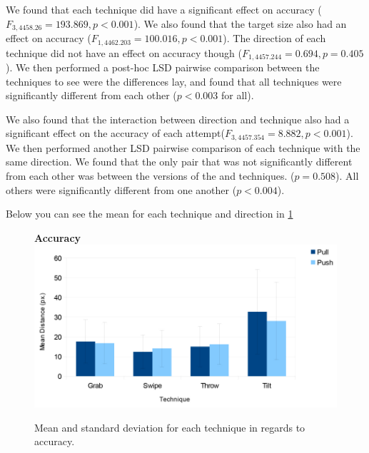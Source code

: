 We found that each technique did have a significant effect on accuracy ($F_{3,4458.26}=193.869, p<0.001$).
We also found that the target size also had an effect on accuracy ($F_{1,4462.203}=100.016, p<0.001$).
The direction of each technique did not have an effect on accuracy though ($F_{1,4457.244}=0.694, p=0.405$). 
We then performed a post-hoc LSD pairwise comparison between the techniques to see were the differences lay, and found that all techniques were significantly different from each other ($p<0.003$ for all).

We also found that the interaction between direction and technique also had a significant effect on the accuracy of each attempt($F_{3,4457.354}=8.882, p<0.001$). 
We then performed another LSD pairwise comparison of each technique with the same direction. 
We found that the only pair that was not significantly different from each other was between the \pull versions of the \grab and \throw techniques. ($p=0.508$). 
All others were significantly different from one another ($p<0.004$). 

Below you can see the mean for each technique and direction in \cref{fig:accuracyGraph}
\begin{figure}[H]{
	\centering
	\textbf{Accuracy}\\[4pt]
	\includegraphics[width = 1\columnwidth ]{images/distance_graph.pdf}} 
	\caption{
		Mean and standard deviation for each technique in regards to accuracy.
	}
	\label{fig:accuracyGraph}
\end{figure}




